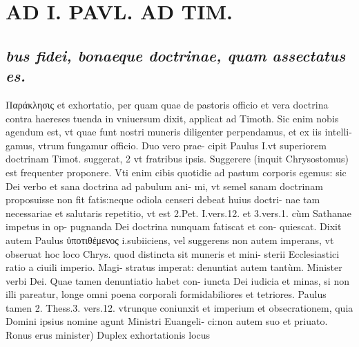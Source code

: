 \documentclass{article}
\begin{document}
\begin{pages}
\subsection*{\textit{}}
\section*{AD I. PAVL. AD TIM. }
\marginpar{[ p.200 ]}
{}
\subsection*{\textit{bus fidei, bonaeque doctrinae, quam assectatus es. }}\pstart Παράκλησις et exhortatio, per quam quae de pastoris officio et vera doctrina contra haereses tuenda in vniuersum dixit, applicat ad Timoth. Sic enim nobis agendum est, vt quae funt nostri muneris diligenter perpendamus, et ex iis intelli- gamus, vtrum fungamur officio. Duo vero prae- cipit Paulus I.vt superiorem doctrinam Timot. suggerat, 2 vt fratribus ipsis. Suggerere (inquit Chrysostomus) est frequenter proponere. Vti enim cibis quotidie ad pastum corporis egemus: sic Dei verbo et sana doctrina ad pabulum ani- mi, vt semel sanam doctrinam proposuisse non fit fatis:neque  odiola censeri debeat huius doctri- nae tam necessariae et salutaris repetitio, vt est 2.Pet. I.vers.12. et 3.vers.1. cùm Sathanae impetus in op- pugnanda Dei doctrina nunquam fatiscat et con- quiescat.  \pend\pstart Dixit autem Paulus ὐποτιθέμενος i.subiiciens, vel suggerens non autem imperans, vt obseruat hoc loco Chrys. quod distincta sit muneris et mini- sterii Ecclesiastici ratio a ciuili imperio. Magi- stratus imperat: denuntiat autem tantùm. Minister verbi Dei. Quae tamen denuntiatio habet con- iuncta Dei iudicia et minas, si non illi pareatur, longe omni poena corporali formidabiliores et tetriores. Paulus tamen 2. Thess.3. vers.12. vtrunque  coniunxit et imperium et obsecrationem, quia Domini ipsius nomine agunt Ministri Euangeli- ci:non autem suo et priuato.  \pend\pstart Ronus erus minister) Duplex exhortationis locus  \pend

\end{pages}
\end{document}
